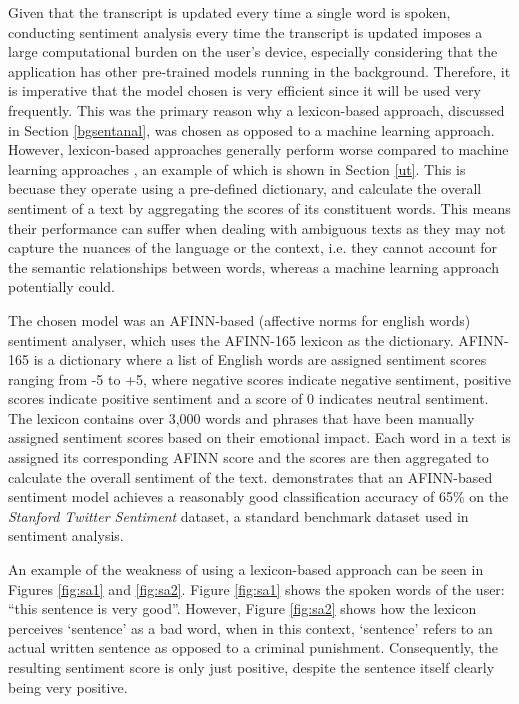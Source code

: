 \documentclass[12pt, a4paper]{article}
\newcommand{\np}
    {
    \vskip 0.4cm
    }
\begin{document}
Given that the transcript is updated every time a single word is spoken, conducting sentiment analysis every time the transcript is updated imposes a large computational burden on the user's device, especially considering that the application has other pre-trained models running in the background. Therefore, it is imperative that the model chosen is very efficient since it will be used very frequently. This was the primary reason why a lexicon-based approach, discussed in Section \ref{bgsentanal}, was chosen as opposed to a machine learning approach. However, lexicon-based approaches generally perform worse compared to machine learning approaches \citep{psomakelis2015comparing}, an example of which is shown in Section \ref{ut}. This is becuase they operate using a pre-defined dictionary, and calculate the overall sentiment of a text by aggregating the scores of its constituent words. This means their performance can suffer when dealing with ambiguous texts as they may not capture the nuances of the language or the context, i.e. they cannot account for the semantic relationships between words, whereas a machine learning approach potentially could.
\np
The chosen model was an AFINN-based (affective norms for english words) sentiment analyser, which uses the AFINN-165 lexicon \citep{afinn} as the dictionary. AFINN-165 is a dictionary where a list of English words are assigned sentiment scores ranging from -5 to +5, where negative scores indicate negative sentiment, positive scores indicate positive sentiment and a score of 0 indicates neutral sentiment. The lexicon contains over 3,000 words and phrases that have been manually assigned sentiment scores based on their emotional impact. Each word in a text is assigned its corresponding AFINN score and the scores are then aggregated to calculate the overall sentiment of the text. \cite{al2020evaluating} demonstrates that an AFINN-based sentiment model achieves a reasonably good classification accuracy of 65\% on the \textit{Stanford Twitter Sentiment} dataset, a standard benchmark dataset used in sentiment analysis. 
\np
An example of the weakness of using a lexicon-based approach can be seen in Figures \ref{fig:sa1} and \ref{fig:sa2}. Figure \ref{fig:sa1} shows the spoken words of the user: ``this sentence is very good''. However, Figure \ref{fig:sa2} shows how the lexicon perceives `sentence' as a bad word, when in this context, `sentence' refers to an actual written sentence as opposed to a criminal punishment. Consequently, the resulting sentiment score is only just positive, despite the sentence itself clearly being very positive.
\end{document}
